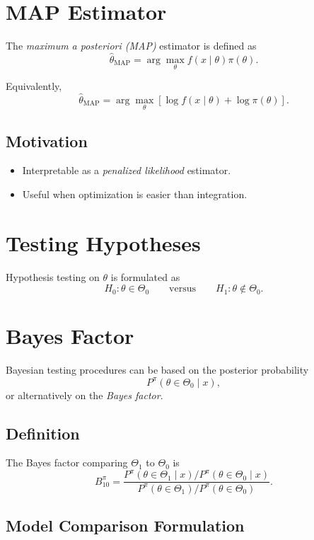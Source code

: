 \documentclass[12pt,oneside]{book}
\numberwithin{equation}{section}
\theoremstyle{definition}
\theoremstyle{plain}
\theoremstyle{remark}
\begin{document}
\section{MAP Estimator}

The \emph{maximum a posteriori (MAP)} estimator is defined as
\[
\hat{\theta}_{\mathrm{MAP}} = \arg\max_{\theta} f(x \mid \theta)\pi(\theta).
\]

Equivalently,
\[
\hat{\theta}_{\mathrm{MAP}} = \arg\max_{\theta} \left[ \log f(x \mid \theta) + \log \pi(\theta) \right].
\]

\subsection*{Motivation}

\begin{itemize}
\item Interpretable as a \emph{penalized likelihood} estimator.
\item Useful when optimization is easier than integration.
\end{itemize}

\section{Testing Hypotheses}

Hypothesis testing on $\theta$ is formulated as
\[
H_0: \theta \in \Theta_0
\qquad \text{versus} \qquad
H_1: \theta \notin \Theta_0.
\]

\section{Bayes Factor}

Bayesian testing procedures can be based on the posterior probability
\[
P^{\pi}(\theta \in \Theta_0 \mid x),
\]
or alternatively on the \emph{Bayes factor}.

\subsection*{Definition}

The Bayes factor comparing $\Theta_1$ to $\Theta_0$ is
\[
B^{\pi}_{10}
=
\frac{P^{\pi}(\theta \in \Theta_1 \mid x) / P^{\pi}(\theta \in \Theta_0 \mid x)}
{P^{\pi}(\theta \in \Theta_1) / P^{\pi}(\theta \in \Theta_0)}.
\]

\subsection*{Model Comparison Formulation}
\end{document}

